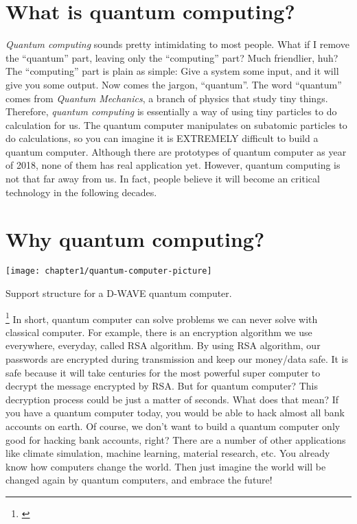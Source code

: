 \section{\textbf{What} is quantum computing?}

\begin{fullwidth}

\textit{Quantum computing} sounds pretty intimidating to most people. What if I remove the ``quantum'' part, leaving only the ``computing'' part? 
Much friendlier, huh? 
The ``computing'' part is plain as simple: Give a system some input, and it will give you some output. 
Now comes the jargon, ``quantum''. The word ``quantum'' comes from \textit{Quantum Mechanics}, a branch of physics that study tiny things. 
Therefore, \textit{quantum computing} is essentially a way of using tiny particles to do calculation for us.
The quantum computer manipulates on subatomic particles to do calculations, so you can imagine it is EXTREMELY difficult to build a quantum computer.
Although there are prototypes of quantum computer as year of 2018, none of them has real application yet.
However, quantum computing is not that far away from us.
In fact, people believe it will become an critical technology in the following decades.

\end{fullwidth}

\section{\textbf{Why} quantum computing?}

\begin{marginfigure}[15\baselineskip]
    \texttt{[image: chapter1/quantum-computer-picture]}
    \caption{Support structure for a D-WAVE quantum computer.}
    \label{fig:chapter1-quantum-computer-picture}
\end{marginfigure}

\footnote{\cite{Chapter1-quantum-computer-picture}}
In short, quantum computer can solve problems we can never solve with classical computer.
For example, there is an encryption algorithm we use everywhere, everyday, called RSA algorithm.
By using RSA algorithm, our passwords are encrypted during transmission and keep our money/data safe.
It is safe because it will take centuries for the most powerful super computer to decrypt the message encrypted by RSA.
But for quantum computer? This decryption process could be just a matter of seconds. 
What does that mean? If you have a quantum computer today, you would be able to hack almost all bank accounts on earth.
Of course, we don't want to build a quantum computer only good for hacking bank accounts, right?
There are a number of other applications like climate simulation, machine learning, material research, etc.
You already know how computers change the world.
Then just imagine the world will be changed again by quantum computers, and embrace the future!

